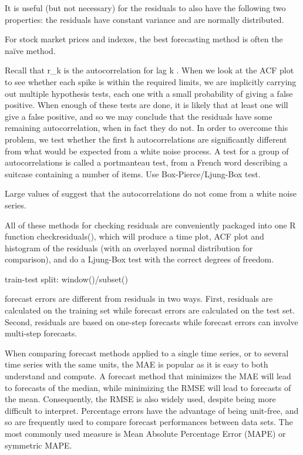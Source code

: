 \documentclass[]{book}
\begin{document}
It is useful (but not necessary) for the residuals to also have the
following two properties: the residuals have constant variance and are
normally distributed.

For stock market prices and indexes, the best forecasting method is
often the naïve method.

Recall that r\_k is the autocorrelation for lag k . When we look at the
ACF plot to see whether each spike is within the required limits, we are
implicitly carrying out multiple hypothesis tests, each one with a small
probability of giving a false positive. When enough of these tests are
done, it is likely that at least one will give a false positive, and so
we may conclude that the residuals have some remaining autocorrelation,
when in fact they do not. In order to overcome this problem, we test
whether the first h autocorrelations are significantly different from
what would be expected from a white noise process. A test for a group of
autocorrelations is called a portmanteau test, from a French word
describing a suitcase containing a number of items. Use
Box-Pierce/Ljung-Box test.

Large values of suggest that the autocorrelations do not come from a
white noise series.

All of these methods for checking residuals are conveniently packaged
into one R function checkresiduals(), which will produce a time plot,
ACF plot and histogram of the residuals (with an overlayed normal
distribution for comparison), and do a Ljung-Box test with the correct
degrees of freedom.

train-test split: window()/subset()

forecast errors are different from residuals in two ways. First,
residuals are calculated on the training set while forecast errors are
calculated on the test set. Second, residuals are based on one-step
forecasts while forecast errors can involve multi-step forecasts.

When comparing forecast methods applied to a single time series, or to
several time series with the same units, the MAE is popular as it is
easy to both understand and compute. A forecast method that minimizes
the MAE will lead to forecasts of the median, while minimizing the RMSE
will lead to forecasts of the mean. Consequently, the RMSE is also
widely used, despite being more difficult to interpret. Percentage
errors have the advantage of being unit-free, and so are frequently used
to compare forecast performances between data sets. The most commonly
used measure is Mean Absolute Percentage Error (MAPE) or symmetric MAPE.
\end{document}
